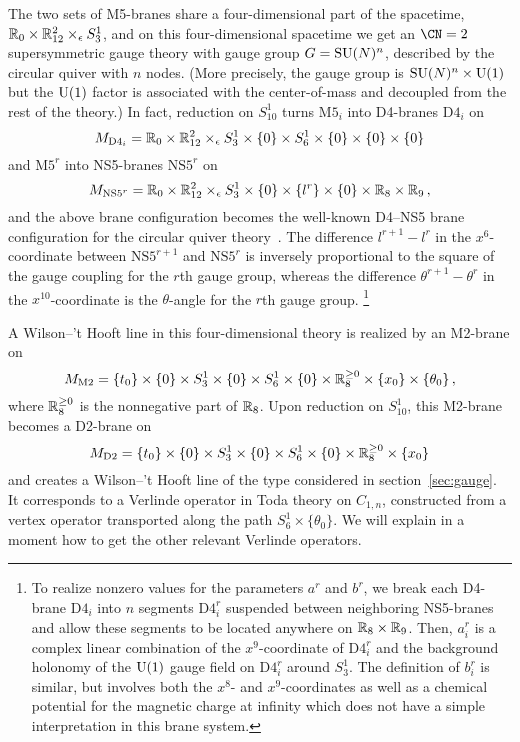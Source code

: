 The two sets of M5-branes share a four-dimensional part of the
spacetime, $\mathbb{R}_0 \times \mathbb{R}^2_{12} \times_\epsilon S^1_3$, and on this
four-dimensional spacetime we get an $\CN = 2$ supersymmetric gauge
theory with gauge group $G = \mathrm{SU}(N)^n$, described by the circular
quiver with $n$ nodes.  (More precisely, the gauge group is
$\mathrm{SU}(N)^n \times \mathrm{U}(1)$ but the $\mathrm{U}(1)$ factor is associated with the
center-of-mass and decoupled from the rest of the theory.)  In fact,
reduction on $S^1_{10}$ turns $\mathrm{M5}_i$ into D4-branes
$\mathrm{D4}_i$ on
\begin{equation}
  M_{\mathrm{D4}_i} =
  \mathbb{R}_0 \times \mathbb{R}^2_{12} \times_\epsilon S^1_3 \times \{0\}
  \times S^1_6 \times \{0\} \times \{0\} \times \{0\}
\end{equation}
and $\mathrm{M5}^r$ into NS5-branes $\mathrm{NS5}^r$ on
\begin{equation}
  M_{\mathrm{NS5}^r} =
  \mathbb{R}_0 \times \mathbb{R}^2_{12} \times_\epsilon S^1_3 \times \{0\}
  \times \{l^r\} \times \{0\} \times \mathbb{R}_8 \times \mathbb{R}_9 \,,
\end{equation}
and the above brane configuration becomes the well-known D4--NS5 brane
configuration for the circular quiver theory~\cite{Witten:1997sc}.
The difference $l^{r+1} - l^r$ in the $x^6$-coordinate between
$\mathrm{NS5}^{r+1}$ and $\mathrm{NS5}^r$ is inversely proportional to
the square of the gauge coupling for the $r$th gauge group, whereas
the difference $\theta^{r+1} - \theta^r$ in the $x^{10}$-coordinate is
the $\theta$-angle for the $r$th gauge group.%
%
\footnote{To realize nonzero values for the parameters $a^r$ and
  $b^r$, we break each D4-brane $\mathrm{D4}_i$ into $n$ segments
  $\mathrm{D4}_i^r$ suspended between neighboring NS5-branes and allow
  these segments to be located anywhere on $\mathbb{R}_8 \times \mathbb{R}_9$.  Then,
  $a^r_i$ is a complex linear combination of the $x^9$-coordinate of
  $\mathrm{D4}_i^r$ and the background holonomy of the $\mathrm{U}(1)$ gauge
  field on $\mathrm{D4}_i^r$ around $S^1_3$.  The definition of
  $b_i^r$ is similar, but involves both the $x^8$- and
  $x^9$-coordinates as well as a chemical potential for the magnetic
  charge at infinity which does not have a simple interpretation in
  this brane system.}

A Wilson--'t Hooft line in this four-dimensional theory is realized by
an M2-brane on
\begin{equation}
  M_{\mathrm{M2}} = 
  \{t_0\} \times \{0\} \times S^1_3 \times \{0\}
  \times S^1_6 \times \{0\} \times \mathbb{R}^{\geq0}_8
  \times \{x_0\} \times \{\theta_0\} \,,
\end{equation}
where $\mathbb{R}^{\geq0}_8$ is the nonnegative part of $\mathbb{R}_8$.  Upon reduction on $S^1_{10}$, this M2-brane becomes a D2-brane on 
\begin{equation}
  M_{\mathrm{D2}} = 
  \{t_0\} \times \{0\} \times S^1_3 \times \{0\}
  \times S^1_6 \times \{0\} \times \mathbb{R}^{\geq0}_8
  \times \{x_0\}
\end{equation}
and creates a Wilson--'t Hooft line of the type considered in
section~\ref{sec:gauge}.  It corresponds to a Verlinde operator in
Toda theory on $C_{1,n}$, constructed from a vertex operator
transported along the path $S^1_6 \times \{\theta_0\}$.  We will
explain in a moment how to get the other relevant Verlinde operators.

